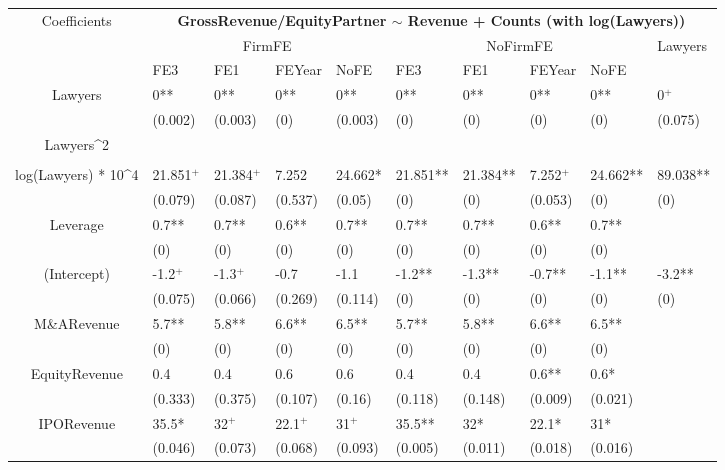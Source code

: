 \documentclass{article}
\begin{document}
\begin{table}[H]
\end{table}


\begin{table}[H]
\centering
\begin{tabular}{|clllllllll|}
\hline
\multirow{3}{*}{Coefficients} & \multicolumn{9}{c|}{\textbf{GrossRevenue/EquityPartner $\sim$ Revenue + Counts (with log(Lawyers))}} \\
\cline{2-10}
& \multicolumn{4}{c}{FirmFE} & \multicolumn{4}{c}{NoFirmFE} & \multirow{2}{*}{Lawyers} \\
\cline{2-9}
& FE3 & FE1 & FEYear & NoFE & FE3 & FE1 & FEYear & NoFE &  \\
\hline
 
Lawyers & 0** & 0** & 0** & 0** & 0** & 0** & 0** & 0** & 0$^{+}$ \\ 
   & (0.002) & (0.003) & (0) & (0.003) & (0) & (0) & (0) & (0) & (0.075) \\ 
  Lawyers^2 &  &  &  &  &  &  &  &  &  \\ 
   &  &  &  &  &  &  &  &  &  \\ 
  log(Lawyers) * 10^4 & 21.851$^{+}$ & 21.384$^{+}$ & 7.252 & 24.662* & 21.851** & 21.384** & 7.252$^{+}$ & 24.662** & 89.038** \\ 
   & (0.079) & (0.087) & (0.537) & (0.05) & (0) & (0) & (0.053) & (0) & (0) \\ 
  Leverage & 0.7** & 0.7** & 0.6** & 0.7** & 0.7** & 0.7** & 0.6** & 0.7** &  \\ 
   & (0) & (0) & (0) & (0) & (0) & (0) & (0) & (0) &  \\ 
  (Intercept) & -1.2$^{+}$ & -1.3$^{+}$ & -0.7 & -1.1 & -1.2** & -1.3** & -0.7** & -1.1** & -3.2** \\ 
   & (0.075) & (0.066) & (0.269) & (0.114) & (0) & (0) & (0) & (0) & (0) \\ 
  M\&ARevenue & 5.7** & 5.8** & 6.6** & 6.5** & 5.7** & 5.8** & 6.6** & 6.5** &  \\ 
   & (0) & (0) & (0) & (0) & (0) & (0) & (0) & (0) &  \\ 
  EquityRevenue & 0.4 & 0.4 & 0.6 & 0.6 & 0.4 & 0.4 & 0.6** & 0.6* &  \\ 
   & (0.333) & (0.375) & (0.107) & (0.16) & (0.118) & (0.148) & (0.009) & (0.021) &  \\ 
  IPORevenue & 35.5* & 32$^{+}$ & 22.1$^{+}$ & 31$^{+}$ & 35.5** & 32* & 22.1* & 31* &  \\ 
   & (0.046) & (0.073) & (0.068) & (0.093) & (0.005) & (0.011) & (0.018) & (0.016) &  \\ 

\end{tabular}
\end{table}
\end{document}
